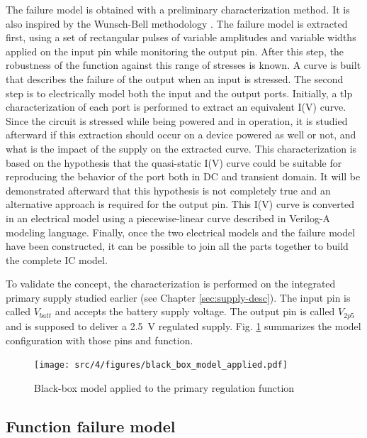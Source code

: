 The failure model is obtained with a preliminary characterization method.
It is also inspired by the Wunsch-Bell methodology \cite{wunsch-bell}.
The failure model is extracted first, using a set of rectangular pulses of variable amplitudes and variable widths applied on the input pin while monitoring the output pin.
After this step, the robustness of the function against this range of stresses is known.
A curve is built that describes the failure of the output when an input is stressed.
The second step is to electrically model both the input and the output ports.
Initially, a \gls{tlp} characterization of each port is performed to extract an equivalent I(V) curve.
Since the circuit is stressed while being powered and in operation, it is studied afterward if this extraction should occur on a device powered as well or not, and what is the impact of the supply on the extracted curve.
This characterization is based on the hypothesis that the quasi-static I(V) curve could be suitable for reproducing the behavior of the port both in DC and transient domain.
It will be demonstrated afterward that this hypothesis is not completely true and an alternative approach is required for the output pin.
This I(V) curve is converted in an electrical model using a piecewise-linear curve described in Verilog-A modeling language.
Finally, once the two electrical models and the failure model have been constructed, it can be possible to join all the parts together to build the complete IC model.

To validate the concept, the characterization is performed on the integrated primary supply studied earlier (see Chapter \ref{sec:supply-desc}).
The input pin is called $V_{batt}$ and accepts the battery supply voltage.
The output pin is called $V_{2p5}$ and is supposed to deliver a \SI{2.5}{\volt} regulated supply.
Fig. \ref{fig:black-box-applied} summarizes the model configuration with those pins and function.

\begin{figure}[!h]
  \centering
  \texttt{[image: src/4/figures/black\_box\_model\_applied.pdf]}
  \caption{Black-box model applied to the primary regulation function}
  \label{fig:black-box-applied}
\end{figure}


\subsection{Function failure model}

